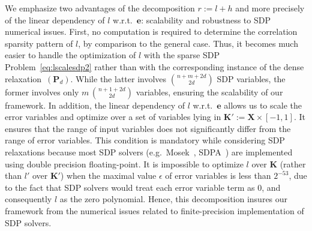 \documentclass[preprint,fleqn,nocopyrightspace]{sigplanconf}
\newcommand{\e}{\mathbf{e}}
\def\P{\mathbf{P}}
\def\K{\mathbf{K}}
\def\X{\mathbf{X}}
\theoremstyle{plain}
\begin{document}
We emphasize two advantages of the decomposition $r := l + h$ and more precisely of the linear dependency of $l$ w.r.t.~$\e$: scalability and robustness to SDP numerical issues.
First, no computation is required to determine the correlation sparsity pattern of $l$, by comparison to the general case. Thus, it becomes much easier to handle the optimization of $l$ with the sparse SDP Problem~\eqref{eq:lscalesdp2} rather than with the corresponding instance of the dense relaxation~$(\P_d)$. While the latter involves $\binom{n + m+ 2 d}{2 d}$ SDP variables, the former involves only $m \, \binom{n + 1 + 2 d}{2 d}$ variables, ensuring the scalability of our framework.
%
In addition, the linear dependency of $l$ w.r.t.~$\e$ allows us to scale the error variables and optimize over a set of variables lying in $\K' := \X \times [-1, 1]$. It ensures that the range of input variables does not significantly differ from the range of error variables. This condition is mandatory while considering SDP relaxations because most SDP solvers (e.g.~{\sc Mosek}~\cite{mosek}, {\sc SDPA}~\cite{sdpa7}) are implemented using double precision floating-point. It is impossible to optimize $l$ over $\K$ (rather than $l'$ over $\K'$) when the maximal value $\epsilon$ of error variables is less than $2^{-53}$, due to the fact that SDP solvers would treat each error variable term as 0, and consequently $l$ as the zero polynomial. Hence, this decomposition insures our framework from the numerical issues related to finite-precision implementation of SDP solvers.
\end{document}
